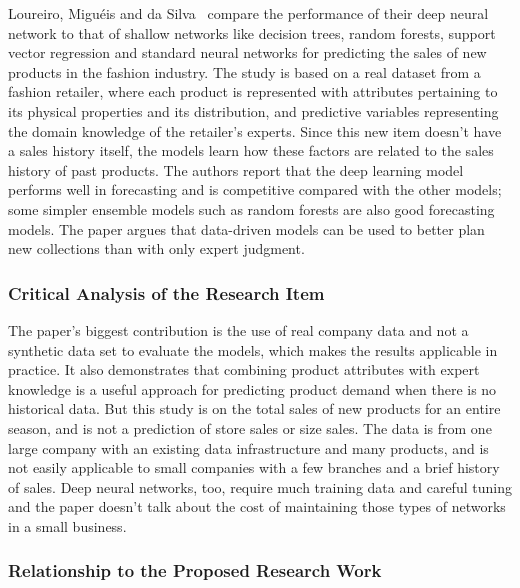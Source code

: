 \documentclass{StockSense}
\begin{document}
Loureiro, Migu\'eis and da Silva~\cite{loureiro2018deep} compare the performance of their deep neural network to that of shallow networks like decision trees, random forests, support vector regression and standard neural networks for predicting the sales of new products in the fashion industry. The study is based on a real dataset from a fashion retailer, where each product is represented with attributes pertaining to its physical properties and its distribution, and predictive variables representing the domain knowledge of the retailer's experts. Since this new item doesn't have a sales history itself, the models learn how these factors are related to the sales history of past products. The authors report that the deep learning model performs well in forecasting and is competitive compared with the other models; some simpler ensemble models such as random forests are also good forecasting models. The paper argues that data-driven models can be used to better plan new collections than with only expert judgment.

\subsubsection{Critical Analysis of the Research Item}

The paper's biggest contribution is the use of real company data and not a synthetic data set to evaluate the models, which makes the results applicable in practice. It also demonstrates that combining product attributes with expert knowledge is a useful approach for predicting product demand when there is no historical data. But this study is on the total sales of new products for an entire season, and is not a prediction of store sales or size sales. The data is from one large company with an existing data infrastructure and many products, and is not easily applicable to small companies with a few branches and a brief history of sales. Deep neural networks, too, require much training data and careful tuning and the paper doesn't talk about the cost of maintaining those types of networks in a small business.

\subsubsection{Relationship to the Proposed Research Work}
\end{document}
